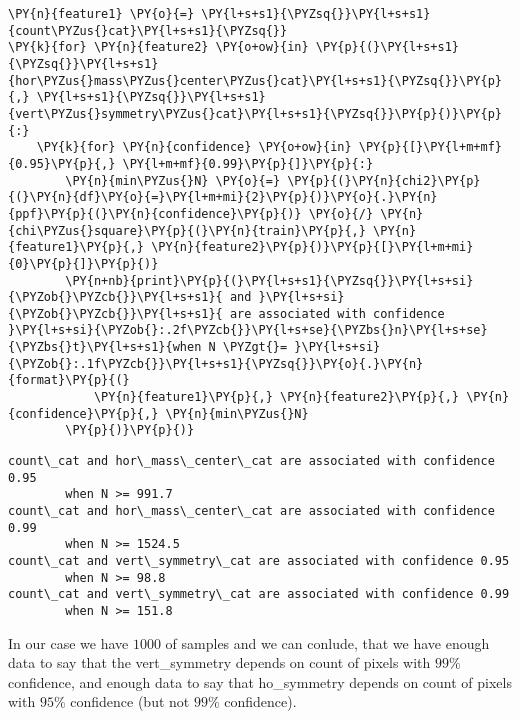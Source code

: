     \begin{tcolorbox}[breakable, size=fbox, boxrule=1pt, pad at break*=1mm,colback=cellbackground, colframe=cellborder]
\begin{Verbatim}[commandchars=\\\{\}]
\PY{n}{feature1} \PY{o}{=} \PY{l+s+s1}{\PYZsq{}}\PY{l+s+s1}{count\PYZus{}cat}\PY{l+s+s1}{\PYZsq{}}
\PY{k}{for} \PY{n}{feature2} \PY{o+ow}{in} \PY{p}{(}\PY{l+s+s1}{\PYZsq{}}\PY{l+s+s1}{hor\PYZus{}mass\PYZus{}center\PYZus{}cat}\PY{l+s+s1}{\PYZsq{}}\PY{p}{,} \PY{l+s+s1}{\PYZsq{}}\PY{l+s+s1}{vert\PYZus{}symmetry\PYZus{}cat}\PY{l+s+s1}{\PYZsq{}}\PY{p}{)}\PY{p}{:}
    \PY{k}{for} \PY{n}{confidence} \PY{o+ow}{in} \PY{p}{[}\PY{l+m+mf}{0.95}\PY{p}{,} \PY{l+m+mf}{0.99}\PY{p}{]}\PY{p}{:}
        \PY{n}{min\PYZus{}N} \PY{o}{=} \PY{p}{(}\PY{n}{chi2}\PY{p}{(}\PY{n}{df}\PY{o}{=}\PY{l+m+mi}{2}\PY{p}{)}\PY{o}{.}\PY{n}{ppf}\PY{p}{(}\PY{n}{confidence}\PY{p}{)} \PY{o}{/} \PY{n}{chi\PYZus{}square}\PY{p}{(}\PY{n}{train}\PY{p}{,} \PY{n}{feature1}\PY{p}{,} \PY{n}{feature2}\PY{p}{)}\PY{p}{[}\PY{l+m+mi}{0}\PY{p}{]}\PY{p}{)}
        \PY{n+nb}{print}\PY{p}{(}\PY{l+s+s1}{\PYZsq{}}\PY{l+s+si}{\PYZob{}\PYZcb{}}\PY{l+s+s1}{ and }\PY{l+s+si}{\PYZob{}\PYZcb{}}\PY{l+s+s1}{ are associated with confidence }\PY{l+s+si}{\PYZob{}:.2f\PYZcb{}}\PY{l+s+se}{\PYZbs{}n}\PY{l+s+se}{\PYZbs{}t}\PY{l+s+s1}{when N \PYZgt{}= }\PY{l+s+si}{\PYZob{}:.1f\PYZcb{}}\PY{l+s+s1}{\PYZsq{}}\PY{o}{.}\PY{n}{format}\PY{p}{(}
            \PY{n}{feature1}\PY{p}{,} \PY{n}{feature2}\PY{p}{,} \PY{n}{confidence}\PY{p}{,} \PY{n}{min\PYZus{}N}
        \PY{p}{)}\PY{p}{)}
\end{Verbatim}
\end{tcolorbox}

    \begin{Verbatim}[commandchars=\\\{\}]
count\_cat and hor\_mass\_center\_cat are associated with confidence 0.95
        when N >= 991.7
count\_cat and hor\_mass\_center\_cat are associated with confidence 0.99
        when N >= 1524.5
count\_cat and vert\_symmetry\_cat are associated with confidence 0.95
        when N >= 98.8
count\_cat and vert\_symmetry\_cat are associated with confidence 0.99
        when N >= 151.8
    \end{Verbatim}

    In our case we have \(1000\) of samples and we can conlude, that we have
enough data to say that the vert\_symmetry depends on count of pixels
with \(99\%\) confidence, and enough data to say that ho\_symmetry
depends on count of pixels with \(95\%\) confidence (but not \(99\%\)
confidence).
